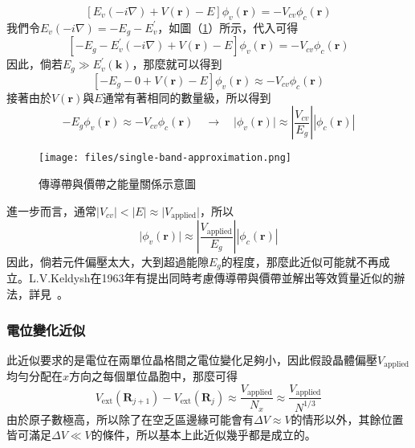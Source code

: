 \begin{equation}
\left[E_v(-i\nabla)+V(\mathbf{r})-E\right]\phi_v(\mathbf{r})=-V_{cv}\phi_c(\mathbf{r})
\end{equation}
我們令$E_v(-i\nabla)=-E_g-E_v^\prime$，如圖（\ref{fig:single-band-approximation}）所示，代入可得
\begin{equation}
\left[-E_g-E_v^\prime(-i\nabla)+V(\mathbf{r})-E\right]\phi_v(\mathbf{r})=-V_{cv}\phi_c(\mathbf{r})
\end{equation}
因此，倘若$E_g\gg E_v^\prime(\mathbf{k})$，那麼就可以得到
\begin{equation}
\left[-E_g-0+V(\mathbf{r})-E\right]\phi_v(\mathbf{r})\approx-V_{cv}\phi_c(\mathbf{r})
\end{equation}
接著由於$V(\mathbf{r})$與$E$通常有著相同的數量級，所以得到
\begin{equation}
-E_g\phi_v(\mathbf{r})\approx-V_{cv}\phi_c(\mathbf{r})\quad\to\quad \vert\phi_v(\mathbf{r})\vert\approx\left\vert\frac{V_{cv}}{E_g}\right\vert\left\vert\phi_c(\mathbf{r})\right\vert
\end{equation}
\begin{figure}
\centering
\texttt{[image: files/single-band-approximation.png]}
\caption{傳導帶與價帶之能量關係示意圖}
\label{fig:single-band-approximation}
\end{figure}
進一步而言，通常$\vert V_{cv}\vert<\vert E\vert\approx\vert V_\text{applied}\vert$，所以
\begin{equation}
\vert\phi_v(\mathbf{r})\vert\approx\left\vert\frac{V_\text{applied}}{E_g}\right\vert\left\vert\phi_c(\mathbf{r})\right\vert
\end{equation}
因此，倘若元件偏壓太大，大到超過能隙$E_g$的程度，那麼此近似可能就不再成立。L.V.Keldysh在1963年有提出同時考慮傳導帶與價帶並解出等效質量近似的辦法，詳見~\cite{keldysh1964deep}。
\subsubsection{電位變化近似}
此近似要求的是電位在兩單位晶格間之電位變化足夠小，因此假設晶體偏壓$V_\text{applied}$均勻分配在$x$方向之每個單位晶胞中，那麼可得
\begin{equation}
V_\text{ext}(\mathbf{R}_{j+1})-V_\text{ext}(\mathbf{R}_{j})\approx \frac{V_\text{applied}}{N_x}\approx\frac{V_\text{applied}}{N^{1/3}}
\end{equation}
由於原子數極高，所以除了在空乏區邊緣可能會有$\Delta V\approx V$的情形以外，其餘位置皆可滿足$\Delta V\ll V$的條件，所以基本上此近似幾乎都是成立的。
